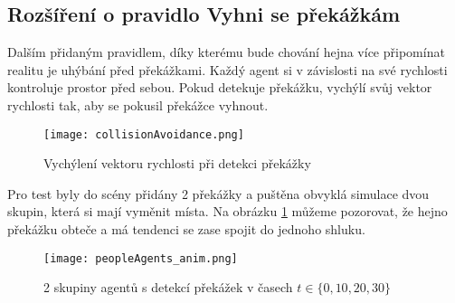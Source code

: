 \subsection{Rozšíření o pravidlo Vyhni se překážkám}
Dalším přidaným pravidlem, díky kterému bude chování hejna více připomínat realitu je uhýbání před překážkami. Každý agent si v závislosti na své rychlosti kontroluje prostor před sebou. Pokud detekuje překážku, vychýlí svůj vektor rychlosti tak, aby se pokusil překážce vyhnout. 
\begin{figure}[H]
	\texttt{[image: collisionAvoidance.png]}
	\centering
	\caption{Vychýlení vektoru rychlosti při detekci překážky \cite{ReynoldsBoidNoBump} }
\end{figure}
Pro test byly do scény přidány 2 překážky a puštěna obvyklá simulace dvou skupin, která si mají vyměnit místa. Na obrázku \ref{fig:agents_anim} můžeme pozorovat, že hejno překážku obteče a má tendenci se zase spojit do jednoho shluku. 
\begin{figure}[H]
	\texttt{[image: peopleAgents\_anim.png]}
	\centering
	\caption{2 skupiny agentů s detekcí překážek v časech $t\in\{ 0,10,20,30\} $}
	\label{fig:agents_anim}
\end{figure}
